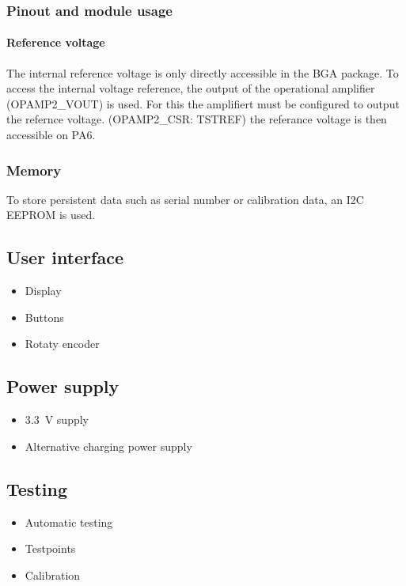 \subsubsection{Pinout and module usage}
\paragraph{Reference voltage}
The internal reference voltage is only directly accessible in the BGA package. To access the internal voltage reference, the output of the operational amplifier (OPAMP2\_VOUT) is used. For this the amplifiert must be configured to output the refernce voltage. (OPAMP2\_CSR: TSTREF) the referance voltage is then accessible on PA6. 

\subsubsection{Memory}
To store persistent data such as serial number or calibration data, an \ac{I2C} \ac{EEPROM} is used. 

\FloatBarrier

\subsection{User interface}
\label{sec_ui}
\begin{itemize}
    \item Display
    \item Buttons
    \item Rotaty encoder
\end{itemize}

\FloatBarrier

\subsection{Power supply}
\label{sec_power_supply}
\begin{itemize}
    \item \qty{3.3}{\volt} supply
    \item Alternative charging power supply
\end{itemize}

\FloatBarrier

\subsection{Testing}
\label{sec_testing}
\begin{itemize}
    \item Automatic testing
    \item Testpoints
    \item Calibration
\end{itemize}

